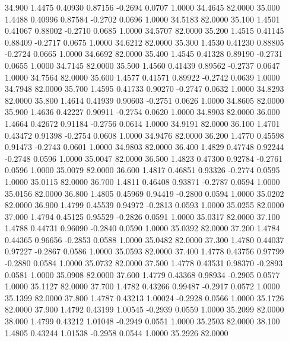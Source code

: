   34.900   1.4475   0.40930   0.87156  -0.2694   0.0707   1.0000  34.4645  82.0000
  35.000   1.4488   0.40996   0.87584  -0.2702   0.0696   1.0000  34.5183  82.0000
  35.100   1.4501   0.41067   0.88002  -0.2710   0.0685   1.0000  34.5707  82.0000
  35.200   1.4515   0.41145   0.88409  -0.2717   0.0675   1.0000  34.6212  82.0000
  35.300   1.4530   0.41230   0.88805  -0.2724   0.0665   1.0000  34.6692  82.0000
  35.400   1.4545   0.41328   0.89190  -0.2731   0.0655   1.0000  34.7145  82.0000
  35.500   1.4560   0.41439   0.89562  -0.2737   0.0647   1.0000  34.7564  82.0000
  35.600   1.4577   0.41571   0.89922  -0.2742   0.0639   1.0000  34.7948  82.0000
  35.700   1.4595   0.41733   0.90270  -0.2747   0.0632   1.0000  34.8293  82.0000
  35.800   1.4614   0.41939   0.90603  -0.2751   0.0626   1.0000  34.8605  82.0000
  35.900   1.4636   0.42227   0.90911  -0.2754   0.0620   1.0000  34.8903  82.0000
  36.000   1.4664   0.42672   0.91184  -0.2756   0.0614   1.0000  34.9191  82.0000
  36.100   1.4701   0.43472   0.91398  -0.2754   0.0608   1.0000  34.9476  82.0000
  36.200   1.4770   0.45598   0.91473  -0.2743   0.0601   1.0000  34.9803  82.0000
  36.400   1.4829   0.47748   0.92244  -0.2748   0.0596   1.0000  35.0047  82.0000
  36.500   1.4823   0.47300   0.92784  -0.2761   0.0596   1.0000  35.0079  82.0000
  36.600   1.4817   0.46851   0.93326  -0.2774   0.0595   1.0000  35.0115  82.0000
  36.700   1.4811   0.46408   0.93871  -0.2787   0.0594   1.0000  35.0156  82.0000
  36.800   1.4805   0.45969   0.94419  -0.2800   0.0594   1.0000  35.0202  82.0000
  36.900   1.4799   0.45539   0.94972  -0.2813   0.0593   1.0000  35.0255  82.0000
  37.000   1.4794   0.45125   0.95529  -0.2826   0.0591   1.0000  35.0317  82.0000
  37.100   1.4788   0.44731   0.96090  -0.2840   0.0590   1.0000  35.0392  82.0000
  37.200   1.4784   0.44365   0.96656  -0.2853   0.0588   1.0000  35.0482  82.0000
  37.300   1.4780   0.44037   0.97227  -0.2867   0.0586   1.0000  35.0593  82.0000
  37.400   1.4778   0.43756   0.97799  -0.2880   0.0584   1.0000  35.0732  82.0000
  37.500   1.4778   0.43531   0.98370  -0.2893   0.0581   1.0000  35.0908  82.0000
  37.600   1.4779   0.43368   0.98934  -0.2905   0.0577   1.0000  35.1127  82.0000
  37.700   1.4782   0.43266   0.99487  -0.2917   0.0572   1.0000  35.1399  82.0000
  37.800   1.4787   0.43213   1.00024  -0.2928   0.0566   1.0000  35.1726  82.0000
  37.900   1.4792   0.43199   1.00545  -0.2939   0.0559   1.0000  35.2099  82.0000
  38.000   1.4799   0.43212   1.01048  -0.2949   0.0551   1.0000  35.2503  82.0000
  38.100   1.4805   0.43244   1.01538  -0.2958   0.0544   1.0000  35.2926  82.0000

